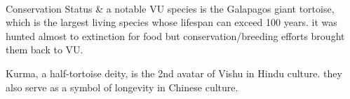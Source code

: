 \begin{center}
\begin{longtabu}
	\\
	\hline
	Conservation Status & 
	a notable VU species is the Galapagos giant tortoise, which is the largest living species whose lifespan can exceed 100 years. it was hunted almost to extinction for food but conservation/breeding efforts brought them back to VU.
	
	Kurma, a half-tortoise deity, is the 2nd avatar of Vishu in Hindu culture. they also serve as a symbol of longevity in Chinese culture.
	\\
	\hline
\end{longtabu}
\end{center}